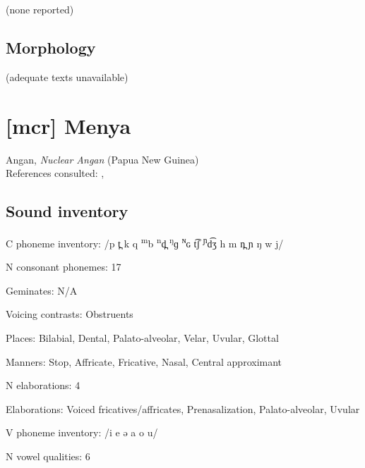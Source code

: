 {(none reported)

\subsection*{Morphology}

(adequate texts unavailable)
\section*{[mcr] Menya}  %
Angan, \textit{Nuclear Angan} (Papua New Guinea)\medskip\\
References consulted: \citet{Whitehead1992}, \citet{Whitehead2004}
\subsection*{Sound inventory}
\begin{appendixdesc}

\item[C phoneme inventory:] /p t̪ k q \textsuperscript{m}b \textsuperscript{n}d̪ \textsuperscript{ŋ}ɡ \textsuperscript{ɴ}ɢ t͡ʃ \textsuperscript{ɲ}d͡ʒ h m n̪ ɲ ŋ w j/

\item[N consonant phonemes:] 17

\item[Geminates:] N/A

\item[Voicing contrasts:] Obstruents

\item[Places:] Bilabial, Dental, Palato-alveolar, Velar, Uvular, Glottal

\item[Manners:] Stop, Affricate, Fricative, Nasal, Central approximant

\item[N elaborations:] 4

\item[Elaborations:] Voiced fricatives/affricates, Prenasalization, Palato-alveolar, Uvular

\item[V phoneme inventory:] /i e ə a o u/

\item[N vowel qualities:] 6


\end{appendixdesc}}
